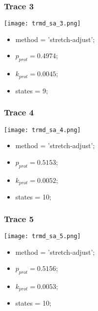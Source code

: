 \subsubsection{Trace 3}
\begin{minipage}[c]{0.7\textwidth}
    \texttt{[image: trmd\_sa\_3.png]}
\end{minipage}
\hfill
\begin{minipage}[c]{0.45\textwidth}
    \begin{itemize}
        \item method = 'stretch-adjust';
        \item $p_{prot}=0.4974$;
        \item $k_{prot}=0.0045$;
        \item states = 9;
    \end{itemize}
\end{minipage}

\subsubsection{Trace 4}
\begin{minipage}[c]{0.7\textwidth}
    \texttt{[image: trmd\_sa\_4.png]}
\end{minipage}
\hfill
\begin{minipage}[c]{0.45\textwidth}
    \begin{itemize}
        \item method = 'stretch-adjust';
        \item $p_{prot}=0.5153$;
        \item $k_{prot}=0.0052$;
        \item states = 10;
    \end{itemize}
\end{minipage}

\subsubsection{Trace 5}
\begin{minipage}[c]{0.7\textwidth}
    \texttt{[image: trmd\_sa\_5.png]}
\end{minipage}
\hfill
\begin{minipage}[c]{0.45\textwidth}
    \begin{itemize}
        \item method = 'stretch-adjust';
        \item $p_{prot}=0.5156$;
        \item $k_{prot}=0.0053$;
        \item states = 10;
    \end{itemize}
\end{minipage}

